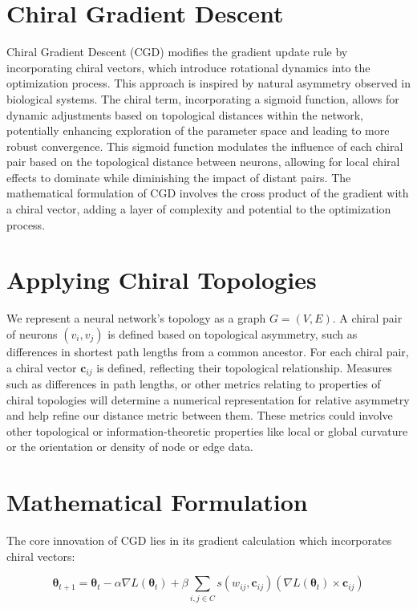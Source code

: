 \documentclass[12pt, a4paper]{article}
\begin{document}
\section{Chiral Gradient Descent}

Chiral Gradient Descent (CGD) modifies the gradient update rule by incorporating chiral vectors, which introduce rotational dynamics into the optimization process. This approach is inspired by natural asymmetry observed in biological systems. The chiral term, incorporating a sigmoid function, allows for dynamic adjustments based on topological distances within the network, potentially enhancing exploration of the parameter space and leading to more robust convergence. This sigmoid function modulates the influence of each chiral pair based on the topological distance between neurons, allowing for local chiral effects to dominate while diminishing the impact of distant pairs. The mathematical formulation of CGD involves the cross product of the gradient with a chiral vector, adding a layer of complexity and potential to the optimization process.


\section{Applying Chiral Topologies}

We represent a neural network's topology as a graph \(G = (V, E)\). A chiral pair of neurons \((v_i, v_j)\) is defined based on topological asymmetry, such as differences in shortest path lengths from a common ancestor. For each chiral pair, a chiral vector \(\mathbf{c}_{ij}\) is defined, reflecting their topological relationship. Measures such as differences in path lengths, or other metrics relating to properties of chiral topologies will determine a numerical representation for relative asymmetry and help refine our distance metric between them. These metrics could involve other topological or information-theoretic properties like local or global curvature or the orientation or density of node or edge data.

\section{Mathematical Formulation}

The core innovation of CGD lies in its gradient calculation which incorporates chiral vectors:

\begin{equation} \label{eq:cgd_sigmoid}
\boldsymbol{\theta}_{t+1} = \boldsymbol{\theta}_t - \alpha \nabla L(\boldsymbol{\theta}_t) + \beta \sum_{i,j \in C} s(w_{ij}, \mathbf{c}_{ij}) (\nabla L(\boldsymbol{\theta}_t) \times \mathbf{c}_{ij})
\end{equation}
\end{document}
